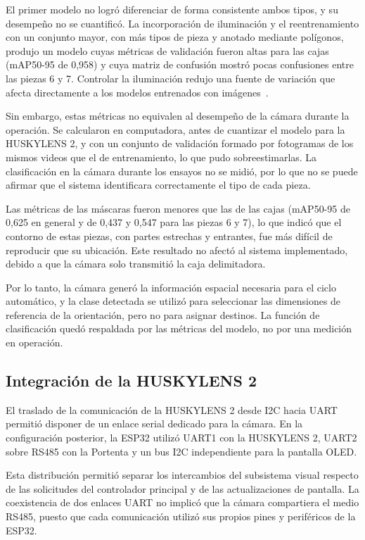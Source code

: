 El primer modelo no logró diferenciar de forma consistente ambos tipos, y su desempeño no se cuantificó. La incorporación de iluminación y el reentrenamiento con un conjunto mayor, con más tipos de pieza y anotado mediante polígonos, produjo un modelo cuyas métricas de validación fueron altas para las cajas (mAP50-95 de 0,958) y cuya matriz de confusión mostró pocas confusiones entre las piezas 6 y 7. Controlar la iluminación redujo una fuente de variación que afecta directamente a los modelos entrenados con imágenes~\cite{szeliski2022computer}.

Sin embargo, estas métricas no equivalen al desempeño de la cámara durante la operación. Se calcularon en computadora, antes de cuantizar el modelo para la HUSKYLENS 2, y con un conjunto de validación formado por fotogramas de los mismos videos que el de entrenamiento, lo que pudo sobreestimarlas. La clasificación en la cámara durante los ensayos no se midió, por lo que no se puede afirmar que el sistema identificara correctamente el tipo de cada pieza.

Las métricas de las máscaras fueron menores que las de las cajas (mAP50-95 de 0,625 en general y de 0,437 y 0,547 para las piezas 6 y 7), lo que indicó que el contorno de estas piezas, con partes estrechas y entrantes, fue más difícil de reproducir que su ubicación. Este resultado no afectó al sistema implementado, debido a que la cámara solo transmitió la caja delimitadora.

Por lo tanto, la cámara generó la información espacial necesaria para el ciclo automático, y la clase detectada se utilizó para seleccionar las dimensiones de referencia de la orientación, pero no para asignar destinos. La función de clasificación quedó respaldada por las métricas del modelo, no por una medición en operación.


\subsection{Integración de la HUSKYLENS 2}

El traslado de la comunicación de la HUSKYLENS 2 desde I2C hacia UART permitió disponer de un enlace serial dedicado para la cámara. En la configuración posterior, la ESP32 utilizó UART1 con la HUSKYLENS 2, UART2 sobre RS485 con la Portenta y un bus I2C independiente para la pantalla OLED.

Esta distribución permitió separar los intercambios del subsistema visual respecto de las solicitudes del controlador principal y de las actualizaciones de pantalla. La coexistencia de dos enlaces UART no implicó que la cámara compartiera el medio RS485, puesto que cada comunicación utilizó sus propios pines y periféricos de la ESP32.


